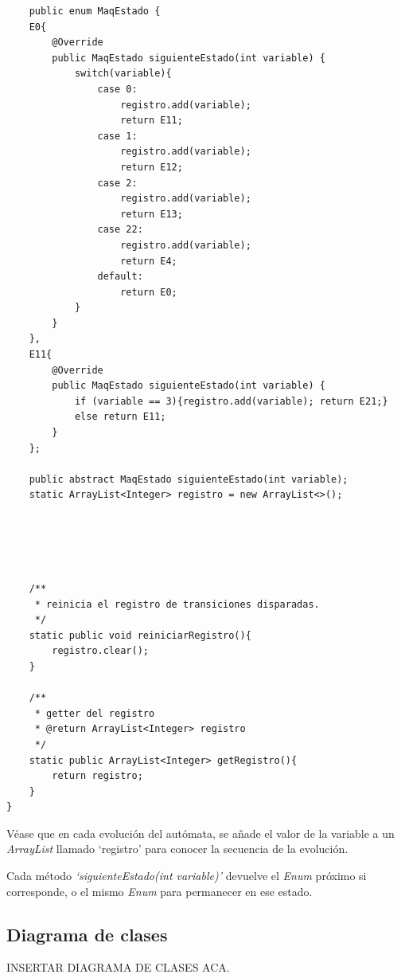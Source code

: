 \documentclass[12pt,a4paper]{article}
\begin{document}
\begin{lstlisting}
    public enum MaqEstado {
    E0{
        @Override
        public MaqEstado siguienteEstado(int variable) {
            switch(variable){
                case 0:
                    registro.add(variable);
                    return E11;
                case 1:
                    registro.add(variable);
                    return E12;
                case 2:
                    registro.add(variable);
                    return E13;
                case 22:
                    registro.add(variable);
                    return E4;
                default:
                    return E0;
            }
        }
    },
    E11{
        @Override
        public MaqEstado siguienteEstado(int variable) {
            if (variable == 3){registro.add(variable); return E21;}
            else return E11;
        }
    };
    
    public abstract MaqEstado siguienteEstado(int variable);
    static ArrayList<Integer> registro = new ArrayList<>();
    
    
    
    
    
    /**
     * reinicia el registro de transiciones disparadas.
     */
    static public void reiniciarRegistro(){
        registro.clear();
    }
    
    /**
     * getter del registro
     * @return ArrayList<Integer> registro
     */
    static public ArrayList<Integer> getRegistro(){
        return registro;
    }
}
\end{lstlisting}
Véase que en cada evolución del autómata, se añade el valor de la variable a un \textit{ArrayList} llamado `registro' para conocer la secuencia de la evolución.

Cada método \textit{`siguienteEstado(int variable)'} devuelve el \textit{Enum} próximo si corresponde, o el mismo \textit{Enum} para permanecer en ese estado.

\subsection{Diagrama de clases}
INSERTAR DIAGRAMA DE CLASES ACA.
\end{document}
